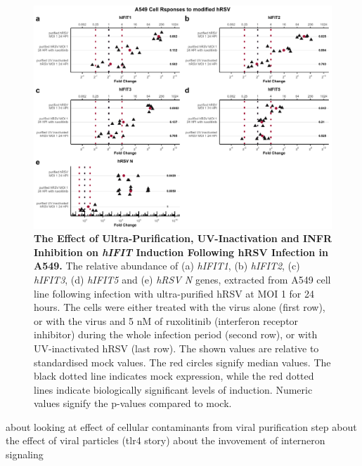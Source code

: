 \begin{figure}
    \centering
    \includegraphics[width=1\linewidth]{06. Chapter 1/Figs/01. Induction/06. a549_hrsv_uv_roxo.pdf}
    \caption[The Effect of Ultra-Purification, UV-Inactivation and INFR Inhibition on \textit{hIFIT} Induction Following hRSV Infection in A549.]{\textbf{The Effect of Ultra-Purification, UV-Inactivation and INFR Inhibition on \textit{hIFIT} Induction Following hRSV Infection in A549.} The relative abundance of (a) \textit{hIFIT1}, (b) \textit{hIFIT2}, (c) \textit{hIFIT3}, (d) \textit{hIFIT5} and (e) \textit{hRSV N} genes, extracted from A549 cell line following infection with ultra-purified hRSV at MOI 1 for 24 hours. The cells were either treated with the virus alone (first row), or with the virus and 5 nM of ruxolitinib (interferon receptor inhibitor) during the whole infection period (second row), or with UV-inactivated hRSV (last row). The shown values are relative to standardised mock values. The red circles signify median values. The black dotted line indicates mock expression, while the red dotted lines indicate biologically significant levels of induction. Numeric values signify the p-values compared to mock.}
    \label{The effect of ultra-purification, UV-inactivation and INFR inhibition on hIFIT induction following hRSV infection in A549}
\end{figure}

about looking at effect of cellular contaminants from viral purification step
about the effect of viral particles (tlr4 story)
about the invovement of interneron signaling


